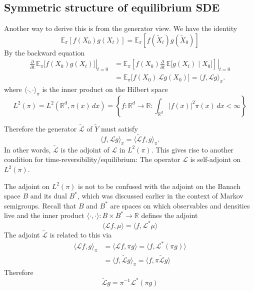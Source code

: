 \documentclass[11pt]{article}
\begin{document}
\subsection*{Symmetric structure of equilibrium SDE}


Another way to derive this is from the generator view. We have the identity 
\begin{equation}
{\mathbb E}_{\pi}[f(X_0)g(X_t)] = {\mathbb E}_{\pi}[f(\tilde{X}_t)g(\tilde{X}_0)] 
\end{equation}
By the backward equation 
\begin{equation}
\begin{aligned}
\left.\frac{\partial}{\partial t}\,\mathbb{E}_{\pi}\big[f(X_0)g(X_t)\big]\right|_{t=0}
&=
\left.\mathbb{E}_{\pi}\!\left[f(X_0) \frac{\partial}{\partial t}\,\mathbb{E}\big[g(X_t)\mid X_0\big]\right]\right|_{t=0} \\
&=
\mathbb{E}_{\pi}\big[f(X_0)\,\mathcal{L}g(X_0)\big]
=
\langle f, \mathcal{L}g\rangle_{\pi}.
\end{aligned}
\end{equation}
where $\langle \cdot,\cdot \rangle_{\pi}$ is the inner product on the Hilbert space
\begin{equation}
L^2(\pi)=L^2(\mathbb R^d,\pi(x)\,dx)
=
\left\{f:\mathbb R^d\to\mathbb R:\int_{\mathbb R^d}|f(x)|^2\pi(x)\,dx<\infty\right\}
\end{equation}

Therefore the generator  $\tilde{ \mathcal{L}}$ of $\tilde{Y}$ must satisfy 
\begin{equation}
\langle f, \mathcal{L}g\rangle_{\pi} = \langle \tilde{ \mathcal{L}}f,g\rangle_{\pi}.
\end{equation}
In other words, $\tilde{\mathcal{L}}$ is the adjoint of $\mathcal{L}$ in $L^2(\pi)$. 
This gives rise to another condition for time-reversibility/equilibrium: The operator $\mathcal{L}$ is self-adjoint on $L^2(\pi)$. 

The adjoint on $L^2(\pi)$ is not to be confused with the adjoint on the Banach space $B$ and its dual $B^*$, which was discussed earlier in the context of Markov semigroups. Recall that $B$ and $B^*$ are spaces on which observables and densities live and the inner product $\langle \cdot ,\cdot \rangle: B \times B^* \to {\mathbb R}$ defines the adjoint  
\begin{equation}
\langle {\mathcal L}f,\mu\rangle = \langle f,{\mathcal L}^*\mu\rangle
\end{equation}
The adjoint $\tilde{{\mathcal L}}$ is related to this via 
\begin{align}
\langle {{\mathcal L}} f,g\rangle_\pi &= \langle {{\mathcal L}} f, \pi g\rangle = \langle f,  {{\mathcal L}} ^*( \pi g)\rangle   \\
&= \langle f,\tilde{{\mathcal L}}g\rangle_\pi= \langle f,\pi \tilde{{\mathcal L}}g \rangle
\end{align}
Therefore
\begin{equation}
\tilde{{\mathcal L}}g =  \pi^{-1}{{\mathcal L}} ^*( \pi g)
\end{equation}
\end{document}
